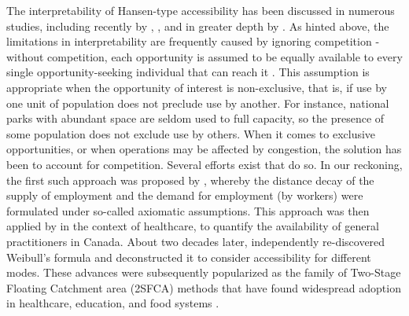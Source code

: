 \documentclass[]{elsarticle} %
\begin{document}
The interpretability of Hansen-type accessibility has been discussed in
numerous studies, including recently by \citet{hu_2019_measuring},
\citet{kelobonye2020measuring}, and in greater depth by
\citet{merlin2017competition}. As hinted above, the limitations in
interpretability are frequently caused by ignoring competition - without
competition, each opportunity is assumed to be equally available to
every single opportunity-seeking individual that can reach it
\citep{shen1998, paez2019, kelobonye2020measuring}. This assumption is
appropriate when the opportunity of interest is non-exclusive, that is,
if use by one unit of population does not preclude use by another. For
instance, national parks with abundant space are seldom used to full
capacity, so the presence of some population does not exclude use by
others. When it comes to exclusive opportunities, or when operations may
be affected by congestion, the solution has been to account for
competition. Several efforts exist that do so. In our reckoning, the
first such approach was proposed by \citet{weibull_axiomatic_1976},
whereby the distance decay of the supply of employment and the demand
for employment (by workers) were formulated under so-called axiomatic
assumptions. This approach was then applied by \citet{joseph1984} in the
context of healthcare, to quantify the availability of general
practitioners in Canada. About two decades later, \citet{shen1998}
independently re-discovered Weibull's
\citeyearpar{weibull_axiomatic_1976} formula \citep[see footnote (7)
in][]{shen1998} and deconstructed it to consider accessibility for
different modes. These advances were subsequently popularized as the
family of Two-Stage Floating Catchment area (2SFCA) methods
\citep{luo2003} that have found widespread adoption in healthcare,
education, and food systems
\citep{yang_comparing_2006, chen_spatial_2020, ye_spatial_2018, chen_enhancing_2019, chen_evaluating_2020}.
\end{document}
